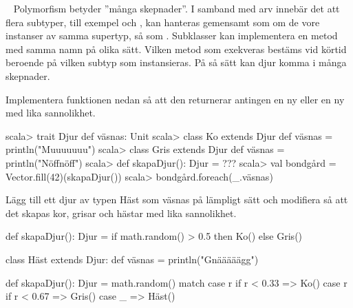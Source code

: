 \QUESTEND







\QUESTBEGIN

\Task  \what~  Polymorfism betyder ''många skepnader''. I samband med arv  innebär det att flera subtyper, till exempel  och , kan hanteras gemensamt som om de vore instanser av samma supertyp, så som . Subklasser kan implementera en metod med samma namn på olika sätt. Vilken metod som exekveras bestäms vid körtid beroende på vilken subtyp som instansieras. På så sätt kan djur komma i många skepnader.

\Subtask Implementera funktionen  nedan så att den returnerar antingen en ny  eller en ny  med lika sannolikhet.

\begin{REPL}
scala> trait Djur { def väsnas: Unit }
scala> class Ko   extends Djur { def väsnas = println("Muuuuuuu") }
scala> class Gris extends Djur { def väsnas = println("Nöffnöff") }
scala> def skapaDjur(): Djur = ???
scala> val bondgård = Vector.fill(42)(skapaDjur())
scala> bondgård.foreach(_.väsnas)
\end{REPL}

\Subtask Lägg till ett djur av typen Häst som väsnas på lämpligt sätt och modifiera  så att det skapas kor, grisar och hästar med lika sannolikhet.


\SOLUTION


\TaskSolved \what


\SubtaskSolved
\begin{Code}
def skapaDjur(): Djur = 
  if math.random() > 0.5 then Ko() else Gris()
\end{Code}

\SubtaskSolved
\begin{Code}
class Häst extends Djur: 
  def väsnas = println("Gnääääägg") 

def skapaDjur(): Djur = 
   math.random() match
    case r if r < 0.33 => Ko() 
    case r if r < 0.67 => Gris() 
    case _             => Häst()
\end{Code}


\QUESTEND







